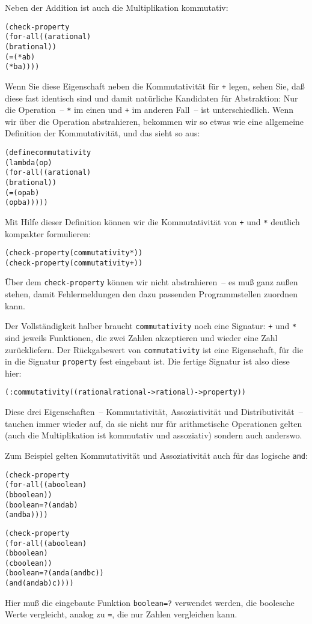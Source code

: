 Neben der Addition ist auch die Multiplikation kommutativ:
%
\begin{alltt}
(check-property
 (for-all ((a rational)
           (b rational))
   (= (* a b)
      (* b a))))
\end{alltt}
%
Wenn Sie diese Eigenschaft neben die Kommutativität für \texttt{+}
legen, sehen Sie, daß diese fast identisch sind und damit natürliche
Kandidaten für Abstraktion: Nur die Operation~-- \texttt{*} im einen
und \texttt{+} im anderen Fall~-- ist unterschiedlich.  Wenn wir über
die Operation abstrahieren, bekommen wir so etwas wie eine allgemeine
Definition der Kommutativität, und das sieht so aus:

\begin{alltt}
(define commutativity
  (lambda (op)
    (for-all ((a rational)
              (b rational))
      (= (op a b)
         (op b a)))))
\end{alltt}
%
Mit Hilfe dieser Definition können wir die Kommutativität von
\texttt{+} und \texttt{*} deutlich kompakter formulieren:
%
\begin{alltt}
(check-property (commutativity *))
(check-property (commutativity +))
\end{alltt}
%
Über dem \texttt{check-property} können wir nicht abstrahieren~-- es
muß ganz außen stehen, damit \drscheme{} Fehlermeldungen den dazu
passenden Programmstellen zuordnen kann.

Der Vollständigkeit halber braucht \texttt{commutativity} noch eine
Signatur: \texttt{+} und \texttt{*} sind jeweils Funktionen, die zwei
Zahlen akzeptieren und wieder eine Zahl zurückliefern.  Der
Rückgabewert von \texttt{commutativity} ist eine Eigenschaft, für die
in \drscheme{} die Signatur \texttt{property} fest eingebaut ist.  Die
fertige Signatur ist also diese hier:
%
\begin{alltt}
(: commutativity ((rational rational -> rational) -> property))
\end{alltt}

Diese drei Eigenschaften~-- Kommutativität, Assoziativität und
Distributivität~-- tauchen immer wieder auf, da sie nicht nur für
arithmetische Operationen gelten (auch die Multiplikation ist
kommutativ und assoziativ) sondern auch anderswo.  

Zum Beispiel gelten
Kommutativität und Assoziativität auch für das logische \texttt{and}:
%
\begin{alltt}
(check-property
 (for-all ((a boolean)
           (b boolean))
    (boolean=? (and a b)
               (and b a))))

(check-property
 (for-all ((a boolean)
           (b boolean)
           (c boolean))
    (boolean=? (and a (and b c))
               (and (and a b) c))))
\end{alltt}
%
Hier muß die eingebaute Funktion \texttt{boolean=?} verwendet werden,
die boolesche Werte vergleicht, analog zu \texttt{=}, die nur Zahlen
vergleichen kann.

